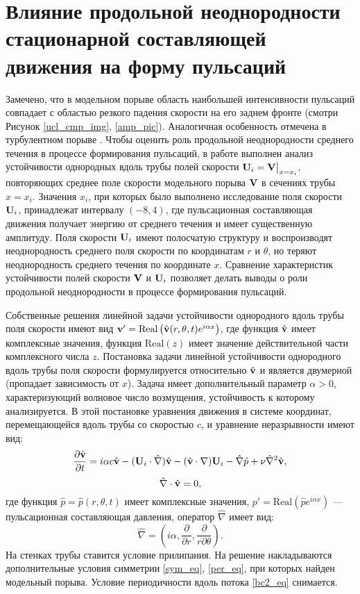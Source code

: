 \section{Влияние продольной неоднородности стационарной составляющей движения на форму пульсаций}

Замечено, что в модельном порыве область наибольшей интенсивности пульсаций совпадает с областью резкого падения скорости на его заднем фронте (смотри Рисунок \ref{ucl_cmp_img}, \ref{amp_pic}). Аналогичная особенность отмечена в турбулентном порыве \cite{Hof2010}. Чтобы оценить роль продольной неоднородности среднего течения в процессе формирования пульсаций, в работе выполнен анализ устойчивости однородных вдоль трубы полей скорости $\mathbf{U}_i = \mathbf{V}\big|_{x=x_i}$, повторяющих среднее поле скорости модельного порыва $\mathbf{V}$ в сечениях трубы $x = x_i$. Значения $x_i$, при которых было выполнено исследование поля скорости $\mathbf{U}_i$, принадлежат интервалу $(-8,4)$, где пульсационная составляющая движения получает энергию от среднего течения и имеет существенную амплитуду. Поля скорости $\mathbf{U}_i$ имеют полосчатую структуру и воспроизводят неоднородность среднего поля скорости по координатам $r$ и $\theta$, но теряют неоднородность среднего течения по координате $x$. Сравнение характеристик устойчивости полей скорости $\mathbf{V}$ и $\mathbf{U}_i$ позволяет делать выводы о роли продольной неоднородности в процессе формирования пульсаций. 

Собственные решения линейной задачи устойчивости однородного вдоль трубы поля скорости имеют вид $\mathbf{v}' = \mathrm{Real}\left(\hat {\mathbf{v}} (r, \theta, t) e^{i \alpha x}\right)$, где функция $\hat {\mathbf{v}}$ имеет комплексные значения, функция $\mathrm{Real}(z)$ имеет значение действительной части комплексного числа $z$. Постановка задачи линейной устойчивости однородного вдоль трубы поля скорости формулируется относительно $\hat {\mathbf{v}}$ и является двумерной (пропадает зависимость от $x$). Задача имеет дополнительный параметр $\alpha > 0$, характеризующий волновое число возмущения, устойчивость к которому анализируется. В этой постановке уравнения движения в системе координат, перемещающейся вдоль трубы со скоростью $c$, и уравнение неразрывности имеют вид: 
\begin{equation} \label{hat_NS_eq}
\frac{\partial \hat {\mathbf{v}}}{\partial t} = i \alpha  c \hat {\mathbf{v}} - (\mathbf{U}_i \cdot \hat \nabla) \hat {\mathbf{v}} - (\hat {\mathbf{v}} \cdot \nabla) \mathbf{U}_i - \hat \nabla \hat p + \nu \hat \nabla^2 \hat {\mathbf{v}},
\end{equation}
\begin{equation} \label{hat_div_eq}
\hat \nabla \cdot \hat {\mathbf{v}} = 0,
\end{equation}
где функция $\hat p = \hat p(r,\theta,t)$ имеет комплексные значения, $p' = \mathrm{Real}\left(\hat p e^{i \alpha x}\right)$ --- пульсационная составляющая давления, оператор $\hat \nabla$ имеет вид: 
\begin{equation*}
\hat \nabla = \left( i\alpha, \frac{\partial}{\partial r}, \frac{\partial}{r \partial \theta} \right).
\end{equation*}
На стенках трубы ставится условие прилипания. На решение накладываются дополнительные условия симметрии \eqref{sym_eq}, \eqref{per_eq}, при которых найден модельный порыва. Условие периодичности вдоль потока \eqref{bc2_eq} снимается. 

